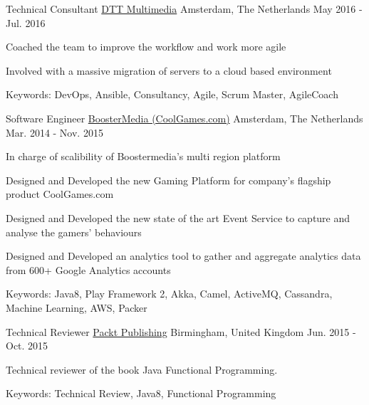 \begin{cventries}
  \cventry
    {Technical Consultant} %
    {\href{https://d-tt.nl/}{DTT Multimedia}} %
    {Amsterdam, The Netherlands} %
    {May 2016 - Jul. 2016} %
      {
          \begin{cvitems} %
            \item {Coached the team to improve the workflow and work more agile}
            \item {Involved with a massive migration of servers to a cloud based environment}
            \item {Keywords: DevOps, Ansible, Consultancy, Agile, Scrum Master, AgileCoach}
          \end{cvitems}
        }

  \cventry
    {Software Engineer} %
    {\href{https://www.coolgames.com/}{BoosterMedia (CoolGames.com)}} %
    {Amsterdam, The Netherlands} %
    {Mar. 2014 - Nov. 2015} %
    {
      \begin{cvitems} %
        \item {In charge of scalibility of Boostermedia's multi region platform}
        \item {Designed and Developed the new Gaming Platform for company's flagship product CoolGames.com}
        \item {Designed and Developed the new state of the art Event Service to capture and analyse the gamers' behaviours}
        \item {Designed and Developed an analytics tool to gather and aggregate analytics data from 600+ Google Analytics accounts}
        \item {Keywords: Java8, Play Framework 2, Akka, Camel, ActiveMQ, Cassandra, Machine Learning, AWS, Packer}
      \end{cvitems}
    }

  \cventry
    {Technical Reviewer} %
    {\href{https://www.packtpub.com/}{Packt Publishing}} %
    {Birmingham, United Kingdom} %
    {Jun. 2015 - Oct. 2015} %
    {
      \begin{cvitems} %
        \item {Technical reviewer of the book Java Functional Programming.}
        \item {Keywords: Technical Review, Java8, Functional Programming}
      \end{cvitems}
    }


\end{cventries}

